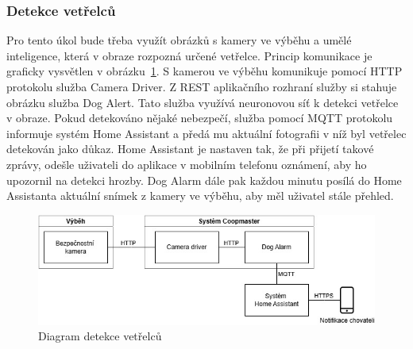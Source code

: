\subsubsection{Detekce vetřelců}
Pro tento úkol bude třeba využít obrázků s kamery ve výběhu a umělé inteligence, která v obraze rozpozná určené vetřelce.
Princip komunikace je graficky vysvětlen v obrázku~\ref{fig:detekce_vetrelcu}.\newline
S kamerou ve výběhu komunikuje pomocí HTTP protokolu služba Camera Driver.
Z REST aplikačního rozhraní služby si stahuje obrázku služba Dog Alert.
Tato služba využívá neuronovou síť k detekci vetřelce v obraze.
Pokud detekováno nějaké nebezpečí, služba pomocí MQTT protokolu informuje systém Home Assistant a předá mu aktuální fotografii v níž byl vetřelec detekován jako důkaz.
Home Assistant je nastaven tak, že při přijetí takové zprávy, odešle uživateli do aplikace v mobilním telefonu oznámení, aby ho upozornil na detekci hrozby.
Dog Alarm dále pak každou minutu posílá do Home Assistanta aktuální snímek z kamery ve výběhu, aby měl uživatel stále přehled.
\begin{figure}[h]
    \centering
    \includegraphics[width=\textwidth]{img/detekce_vetrelcu}
    \caption{Diagram detekce vetřelců}
    \label{fig:detekce_vetrelcu}
\end{figure}

